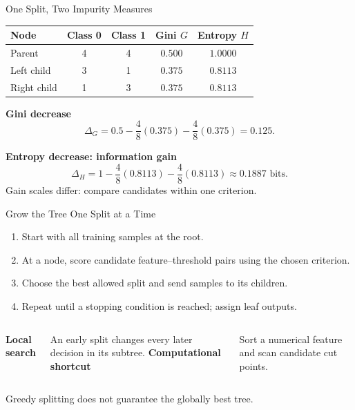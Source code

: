 \begin{frame}{One Split, Two Impurity Measures}
	\setlength{\abovedisplayskip}{5pt}\setlength{\belowdisplayskip}{5pt}
	\setlength{\abovedisplayshortskip}{3pt}\setlength{\belowdisplayshortskip}{5pt}
	\centering
	\renewcommand{\arraystretch}{1.1}
	\begin{tabular}{lcccc}
		\toprule
		Node & Class 0 & Class 1 & Gini $G$ & Entropy $H$\\ \midrule
		Parent & 4 & 4 & $0.500$ & $1.0000$\\
		Left child & 3 & 1 & $0.375$ & $0.8113$\\
		Right child & 1 & 3 & $0.375$ & $0.8113$\\ \bottomrule
	\end{tabular}
	\pause
	\vspace{.1cm}
	\par\textbf{Gini decrease}
	\[\Delta_G=0.5-\frac48(0.375)-\frac48(0.375)=0.125.\]
	\pause
	\par\textbf{Entropy decrease: information gain}
	\[\Delta_H=1-\frac48(0.8113)-\frac48(0.8113)\approx0.1887\text{ bits}.\]
	\centering Gain scales differ: compare candidates within one criterion.
\end{frame}

\begin{frame}{Grow the Tree One Split at a Time}
	\begin{enumerate}\spaceditems
		\item Start with all training samples at the root.
		\item At a node, score candidate feature--threshold pairs using the chosen criterion.
		\pause
		\item Choose the best allowed split and send samples to its children.
		\item Repeat until a stopping condition is reached; assign leaf outputs.
	\end{enumerate}
	\pause
	\vspace{.35cm}
	\begin{columns}[T,onlytextwidth]
		\textbf{Local search}\par
		An early split changes every later decision in its subtree.
		\textbf{Computational shortcut}\par
		Sort a numerical feature and scan candidate cut points.
	\end{columns}
	\vspace{.35cm}
	\centering Greedy splitting does not guarantee the globally best tree.
\end{frame}


